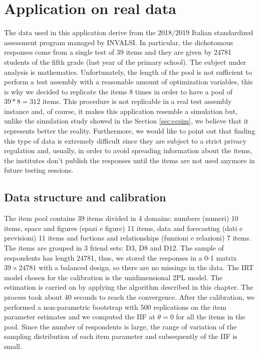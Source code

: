 \section{Application on real data}

The data used in this application derive from the 2018/2019 Italian standardized assessment program managed by INVALSI. In particular, the dichotomous responses come from a single test of 39 items and they are given by 24781 students of the fifth grade (last year of the primary school). The subject under analysis is mathematics. Unfortunately, the length of the pool is not sufficient to perform a test assembly with a reasonable amount of optimization variables, this is why we decided to replicate the items 8 times in order to have a pool of $39*8=312$ items.
This procedure is not replicable in a real test assembly instance and, of course, it makes this application resemble a simulation but, unlike the simulation study showed in the Section \ref{sec:ccsim}, we believe that it represents better the reality. Furthermore, we would like to point out that finding this type of data is extremely difficult since they are subject to a strict privacy regulation and, usually, in order to avoid spreading information about the items, the institutes don't publish the responses until the items are not used anymore in future testing sessions. 

\subsection{Data structure and calibration}

The item pool contains 39 items divided in 4 domains: numbers (numeri) 10 items, space and figures (spazi e figure) 11 items, data and forecasting (dati e previsioni) 11 items and fuctions and relationships (funzioni e relazioni) 7 items. 
The items are grouped in 3 friend sets: D3, D8 and D12. The sample of respondents has length 24781, thus, we stored the responses in a 0-1 matrix $39 \times 24781$ with a balanced design, so there are no missings in the data. The IRT model chosen for the calibration is the unidimensional 2PL model. The estimation is carried on by applying the algorithm described in this chapter. The process took about 40 seconds to reach the convergence. After the calibration, we performed a non-parametric bootstrap  with 500 replications on the item parameter estimates and we computed the IIF at $\theta=0$ for all the items in the pool. Since the number of respondents is large, the range of variation of the sampling distribution of each item parameter and subsequently of the IIF is small. 

